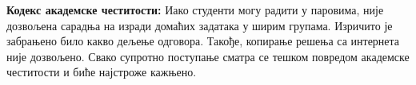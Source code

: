 {\bf Кодекс академске честитости:} Иако студенти могу радити у паровима, није дозвољена сарадња на изради домаћих задатака у ширим групама. Изричито је забрањено било какво дељење одговора. Такође, копирање решења са интернета није дозвољено. Свако супротно поступање сматра се тешком повредом академске честитости и биће најстроже кажњено.

